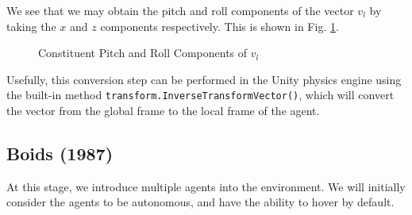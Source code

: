\documentclass[12pt]{article}
\begin{document}
We see that we may obtain the pitch and roll components of the vector $v_l$ by taking the $x$ and $z$ components respectively. This is shown in Fig. \ref{fig:pitch-roll}. 

\begin{figure}[H]
    \centering
    \caption{Constituent Pitch and Roll Components of $v_l$}
    \label{fig:pitch-roll}
\end{figure}

Usefully, this conversion step can be performed in the Unity physics engine using the built-in method \verb|transform.InverseTransformVector()|, which will convert the vector from the global frame to the local frame of the agent.



\subsection{Boids (1987)}
At this stage, we introduce multiple agents into the environment. We will initially consider the agents to be autonomous, and have the ability to hover by default.
\end{document}
